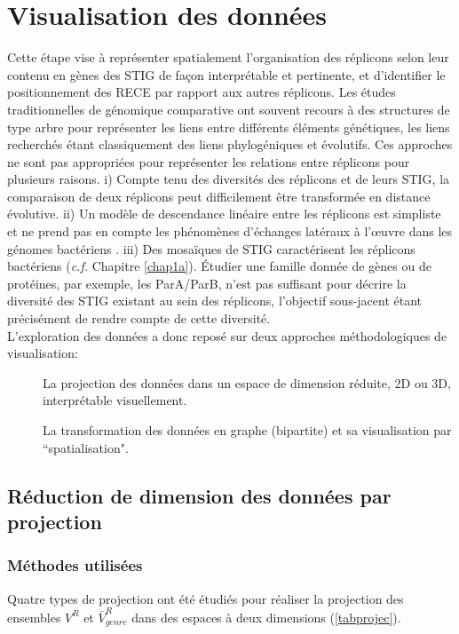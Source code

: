 \section{Visualisation des données}\label{visualis}
    Cette étape vise à représenter spatialement l'organisation des réplicons selon leur contenu en gènes des STIG de façon interprétable et pertinente, et d'identifier le positionnement des RECE par rapport aux autres réplicons. Les études traditionnelles de génomique comparative ont souvent recours à des structures de type arbre pour représenter les liens entre différents éléments génétiques, les liens recherchés étant classiquement des liens phylogéniques et évolutifs. Ces approches ne sont pas appropriées pour représenter les relations entre réplicons pour plusieurs raisons. i) Compte tenu des diversités des réplicons et de leurs STIG, la comparaison de deux réplicons peut difficilement être transformée en distance évolutive. ii) Un modèle de descendance linéaire entre les réplicons est simpliste et ne prend pas en compte les phénomènes d'échanges latéraux à l’œuvre dans les génomes bactériens \citep{Bapteste2009,Doolittle2007}. iii) Des mosaïques de STIG caractérisent les réplicons bactériens (\textit{c.f.} Chapitre \ref{chap1a}). Étudier une famille donnée de gènes ou de protéines, par exemple, les ParA/ParB, n’est pas suffisant pour décrire la diversité des STIG existant au sein des réplicons, l'objectif sous-jacent étant précisément de rendre compte de cette diversité.\\
L'exploration des données a donc reposé sur deux approches méthodologiques de visualisation:
	  \begin{description}
	  \item[\textbullet] La projection des données dans un espace de dimension réduite, 2D ou 3D, interprétable visuellement.
	  \item[\textbullet] La transformation des données en graphe (bipartite) et sa visualisation par ``spatialisation".
	  \end{description}
	  

\subsection{Réduction de dimension des données par projection}
\subsubsection{Méthodes utilisées}
	   Quatre types de projection ont été étudiés pour réaliser la projection des ensembles $V^{R}$ et $\bar{V}^{R}_{genre}$ dans des espaces à deux dimensions (\ref{tabprojec}).
   	   
